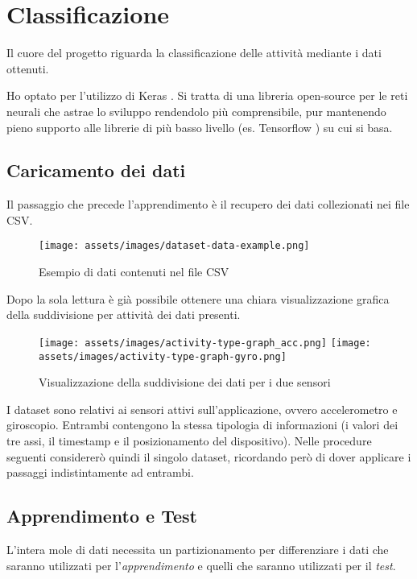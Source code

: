 \chapter{Classificazione}

Il cuore del progetto riguarda la classificazione delle attività mediante i dati ottenuti. 

Ho optato per l'utilizzo di Keras \cite{keras}.
Si tratta di una libreria open-source per le reti neurali che astrae lo sviluppo rendendolo più comprensibile, 
pur mantenendo pieno supporto alle librerie di più basso livello (es. Tensorflow \cite{tensorflow}) su cui si basa.


\section{Caricamento dei dati}
Il passaggio che precede l'apprendimento è il recupero dei dati collezionati nei file CSV.

\begin{figure}[H]
    \centering
    \texttt{[image: assets/images/dataset-data-example.png]}
    \caption{Esempio di dati contenuti nel file CSV}
\end{figure}

Dopo la sola lettura è già possibile ottenere una chiara visualizzazione grafica della suddivisione per attività dei dati presenti.

\begin{figure}[H]
    \centering
    \texttt{[image: assets/images/activity-type-graph\_acc.png]}
    \centering
    \texttt{[image: assets/images/activity-type-graph-gyro.png]}
    \caption{Visualizzazione della suddivisione dei dati per i due sensori}
\end{figure}


\newpage
I dataset sono relativi ai sensori attivi sull'applicazione, ovvero accelerometro e giroscopio.
Entrambi contengono la stessa tipologia di informazioni (i valori dei tre assi, il timestamp e il posizionamento del dispositivo). 
Nelle procedure seguenti considererò quindi il singolo dataset, ricordando però di dover applicare i passaggi indistintamente ad entrambi.

\section{Apprendimento e Test}

L'intera mole di dati necessita un partizionamento per differenziare i dati che saranno utilizzati per 
l'\textit{apprendimento} e quelli che saranno utilizzati per il \textit{test}.


